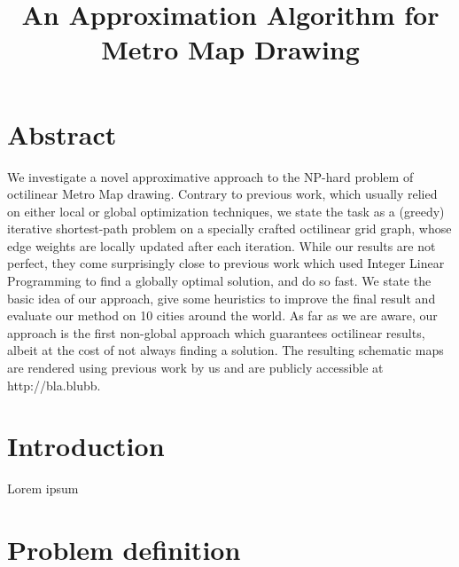 \documentclass{sig-alternate-sigmod09}
\begin{document}
\title{An Approximation Algorithm for Metro Map Drawing}


\maketitle

\section{Abstract}

We investigate a novel approximative approach to the NP-hard problem of octilinear Metro Map drawing. Contrary to previous work, which usually relied on either local or global optimization techniques, we state the task as a (greedy) iterative shortest-path problem on a specially crafted octilinear grid graph, whose edge weights are locally updated after each iteration. While our results are not perfect, they come surprisingly close to previous work which used Integer Linear Programming to find a globally optimal solution, and do so fast. We state the basic idea of our approach, give some heuristics to improve the final result and evaluate our method on 10 cities around the world. As far as we are aware, our approach is the first non-global approach which guarantees octilinear results, albeit at the cost of not always finding a solution. The resulting schematic maps are rendered using previous work by us and are publicly accessible at http://bla.blubb.

\section{Introduction}

Lorem ipsum

\section{Problem definition}
\end{document}
